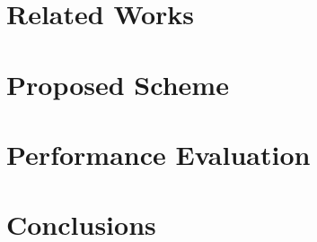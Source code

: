 \documentclass[conference]{IEEEtran}
\begin{document}
\section{Related Works} \label{ch:2-background}
	

\section{Proposed Scheme} \label{ch:3-proposed}
	
	
\section{Performance Evaluation} \label{ch:5-performance}
	
	
\section{Conclusions} \label{ch:6-conclusion}
	
	

	
	
\end{document}
